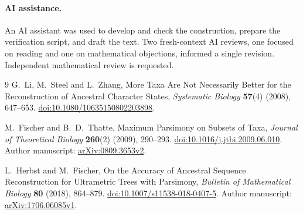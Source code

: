\documentclass[11pt]{article}
\begin{document}
\paragraph{AI assistance.}
An AI assistant was used to develop and check the construction, prepare the
verification script, and draft the text. Two fresh-context AI reviews, one
focused on reading and one on mathematical objections, informed a single
revision. Independent mathematical review is requested.

\begin{thebibliography}{9}
G.~Li, M.~Steel and L.~Zhang,
More Taxa Are Not Necessarily Better for the Reconstruction of Ancestral
Character States,
\emph{Systematic Biology} \textbf{57}(4) (2008), 647--653.
\href{https://doi.org/10.1080/10635150802203898}{doi:10.1080/10635150802203898}.

M.~Fischer and B.~D.~Thatte,
Maximum Parsimony on Subsets of Taxa,
\emph{Journal of Theoretical Biology} \textbf{260}(2) (2009), 290--293.
\href{https://doi.org/10.1016/j.jtbi.2009.06.010}{doi:10.1016/j.jtbi.2009.06.010}.
Author manuscript: \href{https://arxiv.org/abs/0809.3653v2}{arXiv:0809.3653v2}.

L.~Herbst and M.~Fischer,
On the Accuracy of Ancestral Sequence Reconstruction for Ultrametric Trees
with Parsimony,
\emph{Bulletin of Mathematical Biology} \textbf{80} (2018), 864--879.
\href{https://doi.org/10.1007/s11538-018-0407-5}{doi:10.1007/s11538-018-0407-5}.
Author manuscript: \href{https://arxiv.org/abs/1706.06085v1}{arXiv:1706.06085v1}.
\end{thebibliography}
\end{document}
